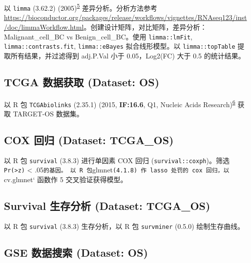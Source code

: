 \documentclass[
]{article}
\begin{document}
以 \texttt{limma} (3.62.2) (2005)\textsuperscript{\protect\hyperlink{ref-LimmaLinearMSmyth2005}{5}} 差异分析。分析方法参考 \url{https://bioconductor.org/packages/release/workflows/vignettes/RNAseq123/inst/doc/limmaWorkflow.html}。创建设计矩阵，对比矩阵，差异分析：Malignant\_cell\_BC vs Benign\_cell\_BC。使用 \texttt{limma::lmFit}, \texttt{limma::contrasts.fit}, \texttt{limma::eBayes} 拟合线形模型。以 \texttt{limma::topTable} 提取所有结果，并过滤得到 adj.P.Val 小于 0.05，\textbar Log2(FC)\textbar{} 大于 0.5 的统计结果。

\hypertarget{tcga-ux6570ux636eux83b7ux53d6-dataset-os}{%
\subsection{TCGA 数据获取 (Dataset: OS)}\label{tcga-ux6570ux636eux83b7ux53d6-dataset-os}}

以 R 包 \texttt{TCGAbiolinks} (2.35.1) (2015, \textbf{IF:16.6}, Q1, Nucleic Acids Research)\textsuperscript{\protect\hyperlink{ref-TcgabiolinksAColapr2015}{6}} 获取 TARGET-OS 数据集。

\hypertarget{cox-ux56deux5f52-dataset-tcga_os}{%
\subsection{COX 回归 (Dataset: TCGA\_OS)}\label{cox-ux56deux5f52-dataset-tcga_os}}

以 R 包 \texttt{survival} (3.8.3) 进行单因素 COX 回归 (\texttt{survival::coxph})。筛选 \texttt{Pr(\textgreater{}\textbar{}z\textbar{})} \textless{} .05\texttt{的基因。\ 以\ R\ 包}glmnet\texttt{(4.1.8)\ 作\ lasso\ 处罚的\ cox\ 回归，以}cv.glmnet` 函数作 5 交叉验证获得模型。

\hypertarget{survival-ux751fux5b58ux5206ux6790-dataset-tcga_os}{%
\subsection{Survival 生存分析 (Dataset: TCGA\_OS)}\label{survival-ux751fux5b58ux5206ux6790-dataset-tcga_os}}

以 R 包 \texttt{survival} (3.8.3) 生存分析，以 R 包 \texttt{survminer} (0.5.0) 绘制生存曲线。

\hypertarget{gse-ux6570ux636eux641cux7d22-dataset-os}{%
\subsection{GSE 数据搜索 (Dataset: OS)}\label{gse-ux6570ux636eux641cux7d22-dataset-os}}
\end{document}
